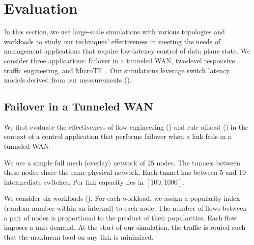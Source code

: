 \section{Evaluation} 
\label{s:evaluation}

In this section, we use large-scale simulations with various topologies and
workloads to study 
our techniques' effectiveness in meeting the needs of management
applications that require low-latency control of data plane
state. We consider three applications: failover in a tunneled WAN, 
two-level responsive traffic engineering, and
MicroTE~\cite{microte}.
Our simulations leverage switch latency models derived from our measurements
().

\subsection{Failover in a Tunneled WAN}%
\label{s:fe_eval}

We first evaluate the effectiveness of flow engineering (\FE) and rule offload
(\RO) in the context of a control application that performs failover when a
link fails in  a tunneled WAN.


 We use a simple full mesh (overlay) network of 25
nodes.  The tunnels between these nodes share the same physical network. Each
tunnel has between 5 and 10 intermediate switches. Per link capacity lies in
$[100,1000]$.

 We consider six workloads (). For
each workload,
we assign a popularity index (random number
within an internal) to each node. The number of flows between a pair
of nodes is proportional to the product of their popularities. Each flow
imposes a unit demand. At the start of our simulation, the traffic is routed
such that the maximum load on any link is minimized.

